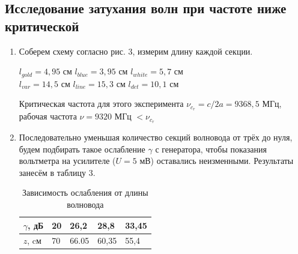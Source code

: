 \documentclass[a4paper]{article}
\begin{document}
\subsection{Исследование затухания волн при частоте ниже критической}
\begin{enumerate}
    \item Соберем схему согласно рис. 3, измерим длину каждой секции.
    \begin{center}
        $l_{gold} = 4,95$ см \hspace{0.5cm} $l_{blue} = 3,95$ см \hspace{0.5cm} $l_{white} = 5,7$ см  \\
        $l_{var} = 14,5$ см \hspace{0.5cm} $l_{line} = 15,3$ см \hspace{0.5cm} $l_{det} = 10,1$ см  \\
    \end{center}
    
    Критическая частота для этого эксперимента $\nu_c_r = c/2a = 9368,5$ МГц, рабочая частота $\nu = 9320$ МГц $< \nu_c_r$
    \item Последовательно уменьшая количество секций волновода от трёх до нуля, будем подбирать такое ослабление $\gamma$ с генератора, чтобы показания вольтметра на усилителе ($U = 5$ мВ) оставались неизменными. Результаты занесём в таблицу 3.
    
\begin{table}[h]
    \centering
    \begin{center}
    \caption{Зависимость ослабления от длины волновода}
    \end{center}
    \vspace{0.1cm}
    \label{tab:my_label}
    \begin{tabular}{ |p{1.5cm}||p{0.7cm}|p{0.7cm}|p{0.7cm}|p{0.7cm}|  }
 \hline
 $\gamma$, дБ & 20 &26,2 &28,8 &33,45    \\
\hline 
 $z$, cм & 70 & 66.05 & 60,35 & 55,4  \\
 \hline
\end{tabular}
\end{table}


\end{enumerate}
\end{document}

